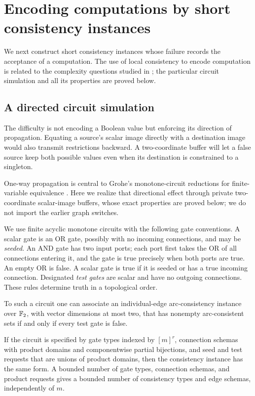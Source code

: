 \section{Encoding computations by short consistency instances}
\label{circ:section}

We next construct short consistency instances whose failure records the
acceptance of a computation. The use of local consistency to encode computation
is related to the complexity questions studied in
\cite{ExistentialPebbles}; the particular circuit simulation and all its
properties are proved below.

\subsection{A directed circuit simulation}

The difficulty is not encoding a Boolean value but enforcing its direction
of propagation. Equating a source's scalar image directly with a destination
image would also transmit restrictions backward. A two-coordinate buffer
will let a false source keep both possible values even when its destination
is constrained to a singleton.

One-way propagation is central to Grohe's monotone-circuit reductions for
finite-variable equivalence \cite{Grohe1999}. Here we realize that
directional effect through private two-coordinate scalar-image buffers,
whose exact properties are proved below; we do not import the earlier
graph switches.

We use finite acyclic monotone circuits with the following gate conventions.
A scalar gate is an OR gate, possibly with no incoming connections, and may be
\emph{seeded}. An AND gate has two input ports; each port first takes the OR of
all connections entering it, and the gate is true precisely when both ports
are true. An empty OR is false. A scalar gate is true if it is seeded or has a
true incoming connection. Designated \emph{test gates} are scalar and have no
outgoing connections. These rules determine truth in a topological order.

\begin{proposition}
\label{circ:simulation}
To such a circuit one can associate an individual-edge arc-consistency
instance over $\mathbb{F}_2$, with vector dimensions at most two, that has nonempty
arc-consistent sets if and only if every test gate is false.

If the circuit is specified by gate types indexed by $[m]^r$, connection
schemas with product domains and componentwise partial bijections, and seed
and test requests that are unions of product domains, then the consistency
instance has the same form. A bounded number of gate types, connection
schemas, and product requests gives a bounded number of consistency types and
edge schemas, independently of $m$.
\end{proposition}

